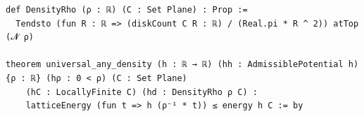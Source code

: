 \begin{Verbatim}[fontsize=\scriptsize,frame=single,framesep=1.5mm]
def DensityRho (ρ : ℝ) (C : Set Plane) : Prop :=
  Tendsto (fun R : ℝ => (diskCount C R : ℝ) / (Real.pi * R ^ 2)) atTop (𝓝 ρ)

theorem universal_any_density (h : ℝ → ℝ) (hh : AdmissiblePotential h) {ρ : ℝ} (hρ : 0 < ρ) (C : Set Plane)
    (hC : LocallyFinite C) (hd : DensityRho ρ C) :
    latticeEnergy (fun t => h (ρ⁻¹ * t)) ≤ energy h C := by
\end{Verbatim}
